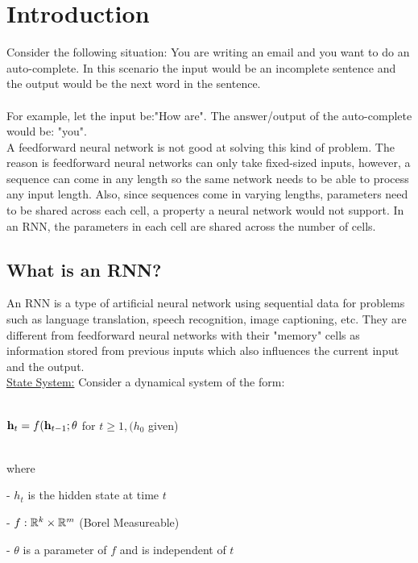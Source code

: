 \section{Introduction}
\noindent Consider the following situation: You are writing an email and you want to do an auto-complete. In this scenario the input would be an incomplete sentence and the output would be the next word in the sentence.\\
\\For example, let the input be:"How are". The answer/output of the auto-complete would be: "you". \\


\noindent A feedforward neural network is not good at solving this kind of problem. The reason is feedforward neural networks can only take fixed-sized inputs, however, a sequence can come in any length so the same network needs to be able to process any input length. Also, since sequences come in varying lengths, parameters need to be shared across each cell, a property a neural network would not support. In an RNN, the parameters in each cell are shared across the number of cells.   \\

\subsection{What is an RNN?} 
 An RNN is a type of artificial neural network using sequential data for problems such as language translation, speech recognition, image captioning, etc. They are different from feedforward neural networks with their "memory" cells as information stored from previous inputs which also influences the current input and the output.  \\

\underline{State System:} Consider a dynamical system of the form:\\
\centerline{\\$\vh_t = f(\vh_{t-1}; \theta$ for $t \geq 1, (h_0 $ given)}
~\\ where 

- $h_t$ is the hidden state at time $t$

- $f: \R^{k} \times \R^{m}$    (Borel Measureable)

- $\theta $ is a parameter of $f$ and is independent of $t$ \\ \\ \\ \\ \\

